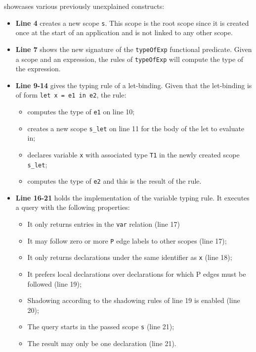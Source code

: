        showcases various previously unexplained constructs:
      \begin{itemize}
        \item \textbf{Line 4} creates a new scope \texttt{s}. This scope is the root scope since it is created once at the start of an application and is not linked to any other scope.
        \item \textbf{Line 7} shows the new signature of the \texttt{typeOfExp} functional predicate. Given a scope and an expression, the rules of \texttt{typeOfExp} will compute the type of the expression.
        \item \textbf{Line 9-14} gives the typing rule of a let-binding. Given that the let-binding is of form \texttt{let x = e1 in e2}, the rule:
        \begin{itemize}
          \item computes the type of \texttt{e1} on line 10;
          \item creates a new scope \texttt{s\_let} on line 11 for the body of the let to evaluate in;
          \item declares variable \texttt{x} with associated type \texttt{T1} in the newly created scope \texttt{s\_let};
          \item computes the type of \texttt{e2} and this is the result of the rule.
        \end{itemize}
        \item \textbf{Line 16-21} holds the implementation of the variable typing rule. It executes a query with the following properties:
        \begin{itemize}
          \item It only returns entries in the \texttt{var} relation (line 17)
          \item It may follow zero or more \texttt{P} edge labels to other scopes (line 17);
          \item It only returns declarations under the same identifier as \texttt{x} (line 18);
          \item It prefers local declarations over declarations for which P edges must be followed (line 19);
          \item Shadowing according to the shadowing rules of line 19 is enabled (line 20);
          \item The query starts in the passed scope \texttt{s} (line 21);
          \item The result may only be one declaration (line 21).
        \end{itemize}
      \end{itemize}

